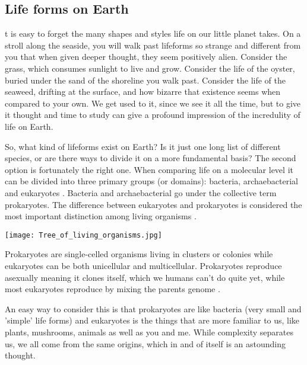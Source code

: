 \subsection{Life forms on Earth}

t is easy to forget the many shapes and styles life on our little planet takes. On a stroll along the seaside, you will walk past lifeforms so strange and different from you that when given deeper thought, they seem positively alien.
Consider the grass, which consumes sunlight to live and grow. Consider the life of the oyster, buried under the sand of the shoreline you walk past.
Consider the life of the seaweed, drifting at the surface, and how bizarre that existence seems when compared to your own.
We get used to it, since we see it all the time, but to give it thought and time to study can give a profound impression of the incredulity of life on Earth.

So, what kind of lifeforms exist on Earth?
Is it just one long list of different species, or are there ways to divide it on a more fundamental basis?
The second option is fortunately the right one.
When comparing life on a molecular level it can be divided into three primary groups (or domains): bacteria, archaebacterial and eukaryotes \cite{Eukaryotes}.
Bacteria and archaebacterial go under the collective term prokaryotes.
The difference between eukaryotes and prokaryotes is considered the most important distinction among living organisms \cite{Procaryotes}. 

\begin{center}
	\texttt{[image: Tree\_of\_living\_organisms.jpg]}
\end{center}

Prokaryotes are single-celled organisms living in clusters or colonies while eukaryotes can be both unicellular and multicellular.
Prokaryotes reproduce asexually meaning it clones itself, which we humans can't do quite yet, while most eukaryotes reproduce by mixing the parents genome \cite{ProcaEuka}. 

An easy way to consider this is that prokaryotes are like bacteria (very small and 'simple' life forms) and eukaryotes is the things that are more familiar to us, like plants, mushrooms, animals as well as you and me.
While complexity separates us, we all come from the same origins, which in and of itself is an astounding thought.

